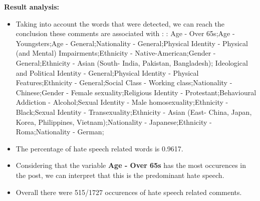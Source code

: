 \documentclass[11pt]{article}
\begin{document}
\textbf{\Large Result analysis:}

\begin{itemize}\item Taking into account the words that were detected, we can reach the conclusion these comments are associated with : : Age - Over 65s;Age - Youngsters;Age - General;Nationality - General;Physical Identity - Physical (and Mental) Impairments;Ethnicity - Native-American;Gender - General;Ethnicity - Asian (South- India, Pakistan, Bangladesh); Ideological and Political Identity - General;Physical Identity - Physical Features;Ethnicity - General;Social Class - Working class;Nationality - Chinese;Gender - Female sexuality;Religious Identity - Protestant;Behavioural Addiction - Alcohol;Sexual Identity - Male homosexuality;Ethnicity - Black;Sexual Identity - Transexuality;Ethnicity - Asian (East- China, Japan, Korea, Philippines, Vietnam);Nationality - Japanese;Ethnicity - Roma;Nationality - German;%

\item The percentage of hate speech related words is 0.9617.

\item Considering that the variable \textbf{Age - Over 65s} has the most occurences in the post, we can interpret that this is the predominant hate speech.

\item Overall there were 515/1727 occurences of hate speech related comments.\end{itemize}
\end{document}
